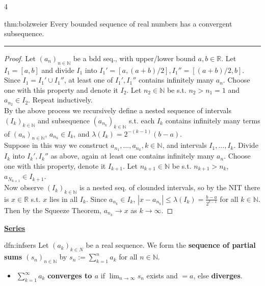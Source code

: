 \documentclass[landscape, 8pt]{extarticle}
\begin{document}
\begin{multicols*}{4}
		
		\begin{thm}{thm:bolzweier}{ }
			Every bounded sequence of real numbers has a convergent subsequence.
			\vspace{1pt}
			\hrule	
			\vspace{-6pt}
			\begin{proof}
				Let $(a_n)_{n\in \mathbb{N}}$ be a bdd seq., with upper/lower bound $a, b\in \mathbb{R}$. Let $I_1 = [a, b]$ and divide $I_1$ into $I_1' = [a, (a+b)/2], I_1'' = [(a+b)/2, b]$. Since $I_1 = I_1' \cup I_1''$, at least one of $I_1', I_1''$ contains infinitely many $a_n$. Choose one with this property and denote it $I_2$. Let $n_2\in \mathbb{N}$ be s.t. $n_2 > n_1 = 1$ and $a_{n_2}\in I_2$. Repeat inductively.\\
				By the above process we recursively define a nested sequence of intervals $(I_k)_{k\in \mathbb{N}}$ and subsequence $(a_{n_k})_{k\in \mathbb{N}}$ s.t. each $I_k$ contains infinitely many terms of $(a_n)_{n\in \mathbb{N}}$, $a_{n_k}\in I_k$, and $\lambda(I_k) = 2^{-(k-1)}(b-a)$.\\
				Suppose in this way we construct $a_{n_1}, ..., a_{n_k}, k\in \mathbb{N}$, and intervals $I_1, ..., I_k$. Divide $I_k$ into $I_k', I_k''$ as above, again at least one contains infinitely many $a_n$. Choose one with this property, denote it $I_{k +1}$. Let $n_{k + 1}\in \mathbb{N}$ be s.t. $n_{k +1} > n_k$, $a_{N_{k+1}}\in I_{k+1}$.\\
				Now observe $(I_k)_{k\in \mathbb{N}}$ is a nested seq. of clounded intervals, so by the NIT there is $x\in \mathbb{R}$ s.t. $x$ lies in all $I_k$. Since $a_{n_k}\in I_k$, $\left|x - a_{n_k}\right| \le \lambda(I_k) = \frac{b-a}{2^{k-1}}$ for all $k\in \mathbb{N}$. Then by the Squeeze Theorem, $a_{n_k} \to x$ as $k \to \infty$.
			\end{proof}
			
		\end{thm}
		
		
		
		{\tiny \textbf{\underline{Series}}}
		
		
		
		\begin{mdfn}{dfn:infsers}{ }
			Let $(a_k)_{k \in N}$ be a real sequence. We form the \textbf{sequence of partial sums $(s_n)_{n \in \mathbb{N}}$} by $s_n := \sum_{k=1}^{n} a_k$ for all $n \in\mathbb{N}$.
			\begin{itemize}
				\item $\sum_{k=1}^{\infty}a_k$ \textbf{converges to $a$} if $\lim_{n\to \infty} s_n$ exists and $= a$, else \textbf{diverges}.
			\end{itemize} 
			

\end{mdfn}
\end{multicols*}
\end{document}
